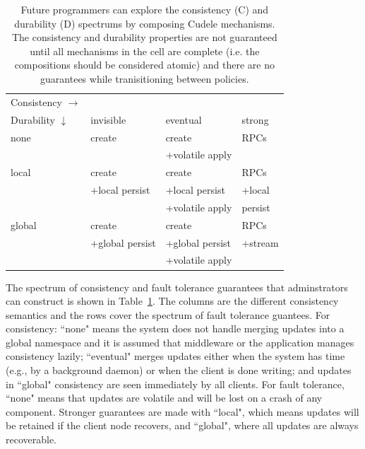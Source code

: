 \begin{table}[t]
\begin{center}
\caption{Future programmers can explore the consistency (C) and
durability (D) spectrums by composing Cudele mechanisms. The consistency
and durability properties are not guaranteed until all mechanisms in the cell
are complete (i.e. the compositions should be considered atomic) and there are
no guarantees while tranisitioning between policies. \label{table:spectrum}}
\begin{tabular}{ l | l | l | l }
  Consistency \(\rightarrow\) &&& \\  
  Durability \(\downarrow\)  & invisible         & eventual        & strong  \\\hline
  none                       & create            & create          & RPCs    \\
                             &                   & +volatile apply &         \\\hdashline
  local                      & create            & create          & RPCs    \\
                             & +local persist    & +local persist  & +local  \\
                             &                   & +volatile apply &  persist\\\hdashline
  global                     & create            & create          & RPCs    \\
                             & +global persist   & +global persist & +stream \\
                             &                   & +volatile apply &         \\
\end{tabular}
\end{center}
\end{table}

The spectrum of consistency and fault tolerance guarantees that adminstrators
can construct is shown in Table~\ref{table:spectrum}. The columns are the
different consistency semantics and the rows cover the spectrum of fault
tolerance guantees. For consistency: ``none" means the system does not handle
merging updates into a global namespace and it is assumed that middleware or
the application manages consistency lazily; ``eventual" merges updates either
when the system has time (e.g., by a background daemon) or when the client is
done writing; and updates in ``global" consistency are seen immediately by all
clients. For fault tolerance, ``none" means that updates are volatile and will
be lost on a crash of any component. Stronger guarantees are made with
``local", which means updates will be retained if the client node recovers, and
``global", where all updates are always recoverable.

